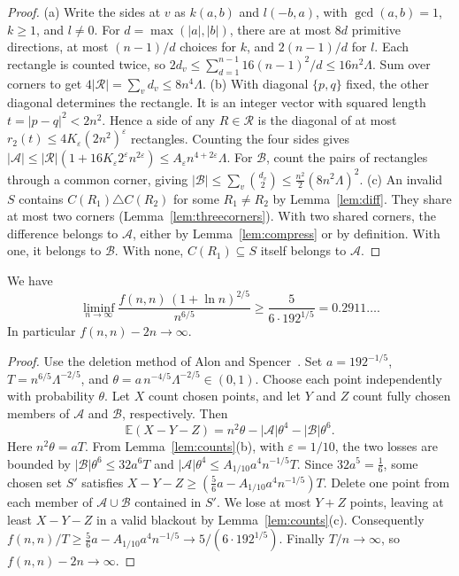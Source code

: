 \begin{proof}
(a) Write the sides at $v$ as $k(a,b)$ and $l(-b,a)$, with
$\gcd(a,b)=1$, $k\ge1$, and $l\ne0$.
For $d=\max(|a|,|b|)$, there are at most $8d$ primitive directions,
at most $(n-1)/d$ choices for $k$, and $2(n-1)/d$ for $l$.
Each rectangle is counted twice, so
$2d_v\le\sum_{d=1}^{n-1}16(n-1)^2/d\le16n^2\Lambda$.
Sum over corners to get
$4|\mathcal R|=\sum_vd_v\le8n^4\Lambda$.
(b) With diagonal $\{p,q\}$ fixed, the other diagonal determines the
rectangle. It is an integer vector with squared length
$t=|p-q|^2<2n^2$. Hence a side of any $R\in\mathcal R$ is the
diagonal of at most $r_2(t)\le4K_\varepsilon(2n^2)^\varepsilon$
rectangles. Counting the four sides gives
$|\mathcal A|\le|\mathcal R|(1+16K_\varepsilon2^\varepsilon n^{2\varepsilon})\le A_\varepsilon n^{4+2\varepsilon}\Lambda$.
For $\mathcal B$, count the pairs of rectangles through a common
corner, giving
$|\mathcal B|\le\sum_v\binom{d_v}2\le\frac{n^2}2(8n^2\Lambda)^2$.
(c) An invalid $S$ contains $C(R_1)\triangle C(R_2)$ for some
$R_1\ne R_2$ by Lemma~\ref{lem:diff}. They share at most two corners
(Lemma~\ref{lem:threecorners}). With two shared corners, the difference
belongs to $\mathcal A$, either by Lemma~\ref{lem:compress} or by
definition. With one, it belongs to $\mathcal B$. With none,
$C(R_1)\subseteq S$ itself belongs to $\mathcal A$.
\end{proof}

\begin{theorem}\label{thm:alteration}
We have
\[
\liminf_{n\to\infty}\frac{f(n,n)\,(1+\ln n)^{2/5}}{n^{6/5}}\ge\frac5{6\cdot192^{1/5}}=0.2911\ldots.
\]
In particular $f(n,n)-2n\to\infty$.
\end{theorem}

\begin{proof}
Use the deletion method of Alon and Spencer~\cite[Section~3.2]{alonspencer2016}.
Set $a=192^{-1/5}$, $T=n^{6/5}\Lambda^{-2/5}$, and
$\theta=a\,n^{-4/5}\Lambda^{-2/5}\in(0,1)$.
Choose each point independently with probability $\theta$.
Let $X$ count chosen points, and let $Y$ and $Z$ count fully chosen
members of $\mathcal A$ and $\mathcal B$, respectively. Then
\[
\mathbb E(X-Y-Z)=n^2\theta-|\mathcal A|\theta^4-|\mathcal B|\theta^6 .
\]
Here $n^2\theta=aT$. From Lemma~\ref{lem:counts}(b),
with $\varepsilon=1/10$, the two losses are bounded by
$|\mathcal B|\theta^6\le32a^6T$ and
$|\mathcal A|\theta^4\le A_{1/10}a^4n^{-1/5}T$.
Since $32a^5=\frac16$, some chosen set $S'$ satisfies
$X-Y-Z\ge(\frac56a-A_{1/10}a^4n^{-1/5})T$.
Delete one point from each member of $\mathcal A\cup\mathcal B$ contained
in $S'$. We lose at most $Y+Z$ points, leaving at least $X-Y-Z$ in a
valid blackout by Lemma~\ref{lem:counts}(c).
Consequently
$f(n,n)/T\ge\frac56a-A_{1/10}a^4n^{-1/5}\to5/(6\cdot192^{1/5})$.
Finally $T/n\to\infty$, so $f(n,n)-2n\to\infty$.
\end{proof}

